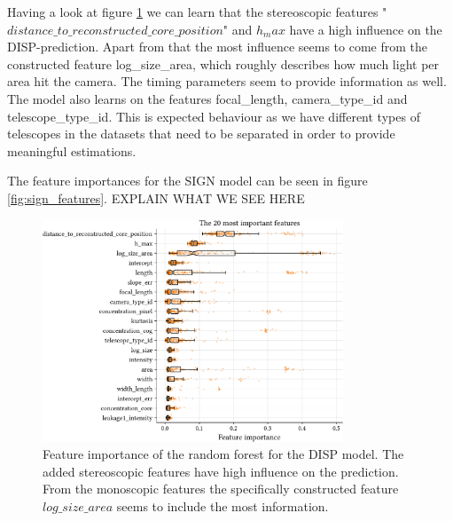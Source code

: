 Having a look at figure \ref{fig:disp_features} we can learn that 
the stereoscopic features "$distance\_to\_reconstructed\_core\_position$"
and $h_max$ have a high influence on the DISP-prediction.
Apart from that the most influence seems to come from the constructed 
feature log\_size\_area, which roughly describes how much light per 
area hit the camera. The timing parameters seem to provide information as 
well. The model also learns on the features focal\_length,  
camera\_type\_id and telescope\_type\_id. This is expected 
behaviour as we have different types of telescopes in the datasets that
need to be separated in order to provide meaningful estimations.

The feature importances for the SIGN model can be seen in figure \ref{fig:sign_features}.
EXPLAIN WHAT WE SEE HERE


\begin{figure}
	\centering
	\includegraphics[width=0.8\textwidth]{../analysis/plots/disp_features.pdf}
	\caption{
	    Feature importance of the random forest for the DISP model.
	    The added stereoscopic features have high influence on the prediction.
    	    From the monoscopic features the specifically constructed feature
    	    $log\_size\_area$ seems to include the most information.}
	\label{fig:disp_features}
\end{figure}

